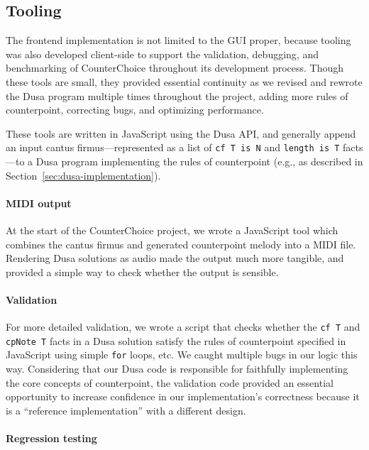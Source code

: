 \subsection{Tooling}
The frontend implementation is not limited to the GUI proper, because tooling was also developed client-side to support the validation, debugging, and benchmarking of CounterChoice throughout its development process.
Though these tools are small, they provided essential continuity as we revised and rewrote the Dusa program multiple times throughout the project, adding more rules of counterpoint, correcting bugs, and optimizing performance.

These tools are written in JavaScript using the Dusa API, and generally append an input cantus firmus---represented as a list of \verb|cf T is N| and \verb|length is T| facts---to a Dusa program implementing the rules of counterpoint (e.g., as described in Section~\ref{sec:dusa-implementation}).

\paragraph{MIDI output}

At the start of the CounterChoice project, we wrote a JavaScript tool which combines the cantus firmus and generated counterpoint melody into a MIDI file.
Rendering Dusa solutions as audio made the output much more tangible, and provided a simple way to check whether the output is sensible.

\paragraph{Validation}

For more detailed validation, we wrote a script that checks whether the \verb|cf T| and \verb|cpNote T| facts in a Dusa solution satisfy the rules of counterpoint specified in JavaScript using simple \verb|for| loops, etc. We caught multiple bugs in our logic this way.
Considering that our Dusa code is responsible for faithfully implementing the core concepts of counterpoint, the validation code provided an essential opportunity to increase confidence in our implementation's correctness because it is a ``reference implementation'' with a different design.

\paragraph{Regression testing}

